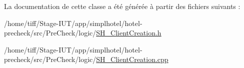 La documentation de cette classe a été générée à partir des fichiers suivants \-:\begin{DoxyCompactItemize}
\item 
/home/tiff/\-Stage-\/\-I\-U\-T/app/simplhotel/hotel-\/precheck/src/\-Pre\-Check/logic/\hyperlink{SH__ClientCreation_8h}{S\-H\-\_\-\-Client\-Creation.\-h}\item 
/home/tiff/\-Stage-\/\-I\-U\-T/app/simplhotel/hotel-\/precheck/src/\-Pre\-Check/logic/\hyperlink{SH__ClientCreation_8cpp}{S\-H\-\_\-\-Client\-Creation.\-cpp}\end{DoxyCompactItemize}
